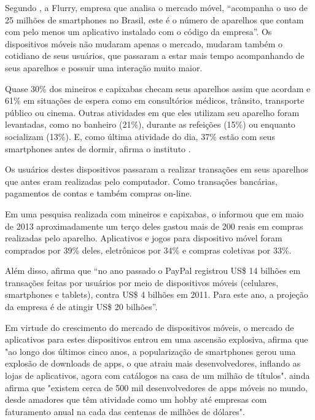 \documentclass[
	12pt,				%
	openright,			%
	oneside,			%
	a4paper,			%
	chapter=TITLE,		%
	section=TITLE,		%
	english,			%
	french,				%
	spanish,			%
	brazil				%
	]{abntex2}
\begin{document}
Segundo , a Flurry, empresa que analisa o mercado móvel, “acompanha o uso de 25 milhões de smartphones no Brasil, este é o número de aparelhos que contam com pelo menos um aplicativo instalado com o código da empresa”.
Os dispositivos móveis não mudaram apenas o mercado, mudaram também o cotidiano de seus usuários, que passaram a estar mais tempo acompanhando de seus aparelhos e possuir uma interação muito maior. 

\begin{citacao}
Quase 30\% dos mineiros e capixabas checam seus aparelhos assim que acordam e 61\% em situações de espera como em consultórios médicos, trânsito, transporte público ou cinema. Outras atividades em que eles utilizam seu aparelho foram levantadas, como no banheiro (21\%), durante as refeições (15\%) ou enquanto socializam (13\%). E, como última atividade do dia, 37\% estão com seus smartphones antes de dormir, afirma o instituto \cite{ibopeNovosProtagonistas}.
\end{citacao}

Os usuários destes dispositivos passaram a realizar transações em seus aparelhos que antes eram realizadas pelo computador. Como transações bancárias, pagamentos de contas e também compras on-line. 

Em uma pesquisa realizada com mineiros e capixabas, o  informou que em maio de 2013 aproximadamente um terço deles gastou mais de 200 reais em compras realizadas pelo aparelho. Aplicativos e jogos para dispositivo móvel foram comprados por 39\% deles, eletrônicos por 34\% e compras coletivas por 33\%. 

Além disso,  afirma que “no ano passado o PayPal registrou US\$ 14 bilhões em transações feitas por usuários por meio de dispositivos móveis (celulares, smartphones e tablets), contra US\$ 4 bilhões em 2011. Para este ano, a projeção da empresa é de atingir US\$ 20 bilhões”.

Em virtude do crescimento do mercado de dispositivos móveis, o mercado de aplicativos para estes dispositivos entrou em uma ascensão explosiva,  afirma que "ao longo dos últimos cinco anos, a popularização de smartphones gerou uma explosão de downloads de apps, o que atraiu mais desenvolvedores, inflando as lojas de aplicativos, agora com catálogos na casa de um milhão de títulos".  ainda afirma que "existem cerca de 500 mil desenvolvedores de apps móveis no mundo, desde amadores que têm atividade como um hobby até empresas com faturamento anual na cada das centenas de milhões de dólares".
\end{document}
